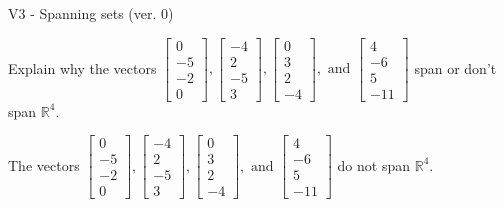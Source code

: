 \begin{exercise}
  \begin{exerciseTitle}V3 - Spanning sets (ver. 0)\end{exerciseTitle}
  \begin{exerciseStatement}
    Explain why the vectors \(\left[\begin{array}{r}
0 \\
-5 \\
-2 \\
0
\end{array}\right] , \left[\begin{array}{r}
-4 \\
2 \\
-5 \\
3
\end{array}\right] , \left[\begin{array}{r}
0 \\
3 \\
2 \\
-4
\end{array}\right] , \text{ and } \left[\begin{array}{r}
4 \\
-6 \\
5 \\
-11
\end{array}\right]\) span or don't span \(\mathbb{R}^4\). 
	


  \end{exerciseStatement}
  \begin{exerciseAnswer}
   The vectors \(\left[\begin{array}{r}
0 \\
-5 \\
-2 \\
0
\end{array}\right] , \left[\begin{array}{r}
-4 \\
2 \\
-5 \\
3
\end{array}\right] , \left[\begin{array}{r}
0 \\
3 \\
2 \\
-4
\end{array}\right] , \text{ and } \left[\begin{array}{r}
4 \\
-6 \\
5 \\
-11
\end{array}\right]\) 
  	 do not  
	span \(\mathbb{R}^4\).
  


  \end{exerciseAnswer}
\end{exercise}